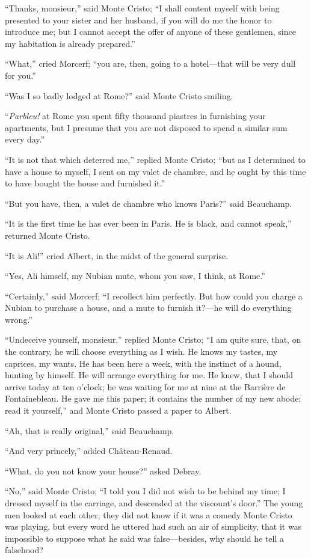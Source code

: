 “Thanks, monsieur,” said Monte Cristo; “I shall content myself with
being presented to your sister and her husband, if you will do me the
honor to introduce me; but I cannot accept the offer of anyone of these
gentlemen, since my habitation is already prepared.”

“What,” cried Morcerf; “you are, then, going to a hotel—that will be
very dull for you.”

“Was I so badly lodged at Rome?” said Monte Cristo smiling.

“\textit{Parbleu!} at Rome you spent fifty thousand piastres in furnishing
your apartments, but I presume that you are not disposed to spend a
similar sum every day.”

“It is not that which deterred me,” replied Monte Cristo; “but as I
determined to have a house to myself, I sent on my valet de chambre,
and he ought by this time to have bought the house and furnished it.”

“But you have, then, a valet de chambre who knows Paris?” said
Beauchamp.

“It is the first time he has ever been in Paris. He is black, and
cannot speak,” returned Monte Cristo.

“It is Ali!” cried Albert, in the midst of the general surprise.

“Yes, Ali himself, my Nubian mute, whom you saw, I think, at Rome.”

“Certainly,” said Morcerf; “I recollect him perfectly. But how could
you charge a Nubian to purchase a house, and a mute to furnish it?—he
will do everything wrong.”

“Undeceive yourself, monsieur,” replied Monte Cristo; “I am quite sure,
that, on the contrary, he will choose everything as I wish. He knows my
tastes, my caprices, my wants. He has been here a week, with the
instinct of a hound, hunting by himself. He will arrange everything for
me. He knew, that I should arrive today at ten o’clock; he was waiting
for me at nine at the Barrière de Fontainebleau. He gave me this paper;
it contains the number of my new abode; read it yourself,” and Monte
Cristo passed a paper to Albert.

“Ah, that is really original,” said Beauchamp.

“And very princely,” added Château-Renaud.

“What, do you not know your house?” asked Debray.

“No,” said Monte Cristo; “I told you I did not wish to be behind my
time; I dressed myself in the carriage, and descended at the viscount’s
door.” The young men looked at each other; they did not know if it was
a comedy Monte Cristo was playing, but every word he uttered had such
an air of simplicity, that it was impossible to suppose what he said
was false—besides, why should he tell a falsehood?

